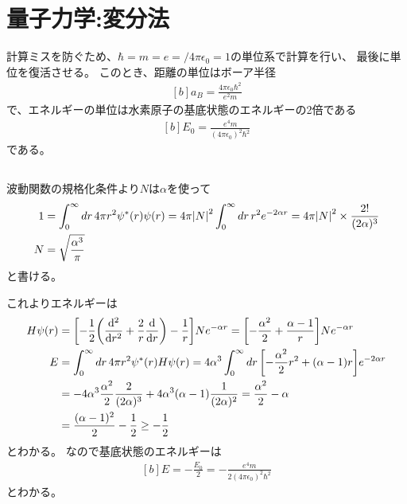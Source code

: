 \documentclass[../ap_2011.tex]{subfiles}
\begin{document}
\chapter{量子力学:変分法}
計算ミスを防ぐため、\(\hbar=m=e=/4\pi\epsilon_0 = 1\)の単位系で計算を行い、
最後に単位を復活させる。
このとき、距離の単位はボーア半径
\begin{equation}\begin{aligned}[b]
    a_B = \frac{4\pi\epsilon_0 \hbar^2}{e^2m}
\end{aligned}\end{equation}
で、エネルギーの単位は水素原子の基底状態のエネルギーの2倍である
\begin{equation}\begin{aligned}[b]
    E_0 = \frac{e^4m}{(4\pi\epsilon_0)^2\hbar^2}
\end{aligned}\end{equation}
である。
\section{}
波動関数の規格化条件より\(N\)は\(\alpha\)を使って
\begin{equation}\begin{aligned}[b]
    1 &= \int_{0}^{\infty}dr\,4\pi r^2\psi^*(r)\psi(r)
    = 4\pi\abs{N}^2\int_0^\infty dr\,r^2e^{-2\alpha r}
    = 4\pi\abs{N}^2\times\frac{2!}{(2\alpha)^3}\\
    N &= \sqrt{\frac{\alpha^3}{\pi}}
\end{aligned}\end{equation}
と書ける。

これよりエネルギーは
\begin{equation}\begin{aligned}[b]
    H\psi(r) &=\qty[
    -\frac{1}{2}\qty(\dv[2]{r}+\frac{2}{r}\dv{r})-\frac{1}{r}]Ne^{-\alpha r}
    =\qty[-\frac{\alpha^2}{2}+\frac{\alpha-1}{r}]Ne^{-\alpha r}\\
    E &= \int_{0}^{\infty}dr\,4\pi r^2 \psi^*(r)H\psi(r)
    = 4\alpha^3\int_{0}^{\infty}dr\,\qty[-\frac{\alpha^2}{2}r^2+(\alpha-1)r]e^{-2\alpha r}\\
    &= -4\alpha^3\frac{\alpha^2}{2}\frac{2}{(2\alpha)^3}+4\alpha^3(\alpha-1)\frac{1}{(2\alpha)^2}
    = \frac{\alpha^2}{2}-\alpha\\
    &=\frac{(\alpha-1)^2}{2}-\frac{1}{2} \geq -\frac{1}{2}
\end{aligned}\end{equation}
とわかる。
なので基底状態のエネルギーは
\begin{equation}\begin{aligned}[b]
    E = -\frac{E_0}{2}= -\frac{e^4m}{2(4\pi\epsilon_0)^2\hbar^2}
\end{aligned}\end{equation}
とわかる。
\end{document}
